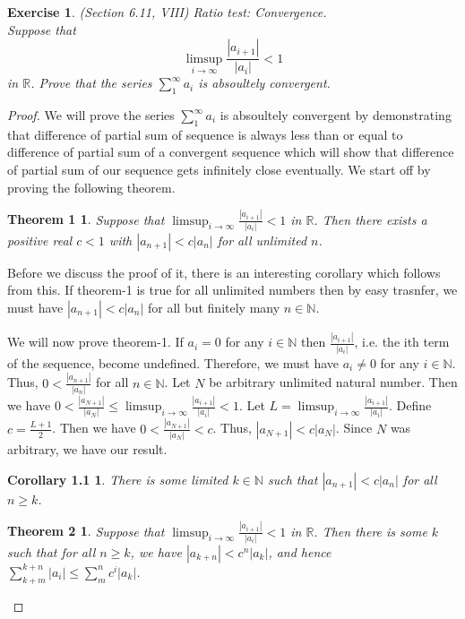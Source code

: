 \documentclass[a4paper, 11pt, openany]{book}
\theoremstyle{plain}
\newtheorem{exercise}{Exercise}[chapter]
\newtheorem*{theorem1}{Theorem 1}
\newtheorem*{corollary1.1}{Corollary 1.1}
\newtheorem*{theorem2}{Theorem 2}
\theoremstyle{plain}
\newcommand{\arr}{\rightarrow}
\newcommand{\N}{\mathbb{N}}
\newcommand{\R}{\mathbb{R}}
\begin{document}
  \begin{exercise}
    (Section 6.11, VIII) Ratio test: Convergence. \\
    Suppose that $$\limsup_{i \arr \infty} \frac{|a_{i+1}|}{|a_i|}<1$$ in $\R$. Prove that the series $\sum_{1}^\infty a_i$ is absoultely convergent.
  \end{exercise}
  \begin{proof}
    We will prove the series $\sum_{1}^\infty a_i$ is absoultely convergent by demonstrating that difference of partial sum of sequence is always less than or equal to difference of partial sum of a convergent sequence which will show that difference of partial sum of our sequence gets infinitely close eventually. We start off by proving the following theorem. 
    \begin{theorem1}
      Suppose that $\limsup_{i \arr \infty} \frac{|a_{i+1}|}{|a_i|}<1$ in $\R$. Then there exists a positive real $c<1$ with $|a_{n+1}|<c|a_n|$ for all unlimited $n$.
    \end{theorem1}
      Before we discuss the proof of it, there is an interesting corollary which follows from this. If theorem-1 is true for all unlimited numbers then by easy trasnfer, we must have $|a_{n+1}|<c|a_n|$ for all but finitely many $n \in \N$. 

      We will now prove theorem-1. If $a_i=0$ for any $i \in \N$ then $\frac{|a_{i+1}|}{|a_i|}$, i.e. the ith term of the sequence, become undefined. Therefore, we must have $a_i \not = 0$ for any $i \in \N$. Thus, $0<\frac{|a_{n+1}|}{|a_n|}$ for all $n \in \N$. Let $N$ be arbitrary unlimited natural number. Then we have $0<\frac{|a_{N+1}|}{|a_N|} \leq \limsup_{i \arr \infty} \frac{|a_{i+1}|}{|a_i|}<1$. Let $L=\limsup_{i \arr \infty} \frac{|a_{i+1}|}{|a_i|}$. Define $c=\frac{L+1}{2}$. Then we have $0<\frac{|a_{N+1}|}{|a_N|}<c$. Thus, $|a_{N+1}|<c |a_N|$. Since $N$ was arbitrary, we have our result.
      \begin{corollary1.1} 
        There is some limited $k \in \N$ such that $|a_{n+1}|<c|a_n|$ for all $n \geq k$.
      \end{corollary1.1}

      \begin{theorem2}
        Suppose that $\limsup_{i \arr \infty} \frac{|a_{i+1}|}{|a_i|}<1$ in $\R$. Then there is some $k$ such that for all $n \geq k$, we have $|a_{k+n}|<c^n |a_k|$, and hence $\sum_{k+m}^{k+n} |a_i| \leq \sum_{m}^n c^i |a_k|$.
      \end{theorem2}


\end{proof}
\end{document}
